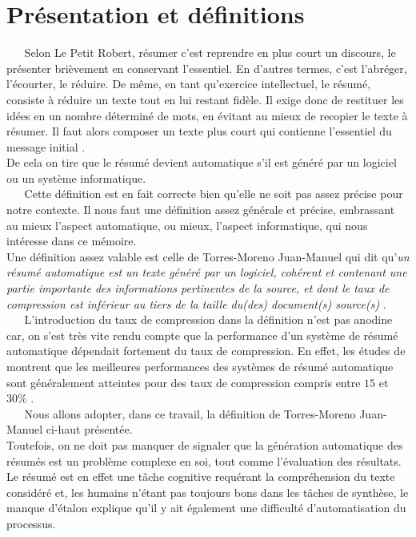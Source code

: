 \section{Présentation et définitions}
$ _{} $ $ _{} $ $ _{} $ $ _{} $ $ _{} $Selon Le Petit Robert, résumer c'est reprendre en plus court un discours, le présenter brièvement en conservant l'essentiel. En d'autres termes, c'est l'abréger, l'écourter, le réduire.
De même, en tant qu'exercice intellectuel, le résumé, consiste à réduire un texte tout en lui restant fidèle. Il exige donc de restituer les idées en un nombre déterminé de mots,  en évitant au mieux de recopier le texte à résumer. Il faut alors composer un texte plus court qui contienne l'essentiel du message initial \cite{fasoEduc}.\\
De cela on tire que le résumé devient automatique s'il est généré par un logiciel ou un système informatique.\\
$ _{} $ $ _{} $ $ _{} $ $ _{} $ $ _{} $Cette définition est en fait correcte bien qu'elle ne soit pas assez précise pour notre contexte. Il nous faut une définition assez générale et précise, embrassant au mieux l'aspect automatique, ou mieux, l'aspect informatique, qui nous intéresse dans ce mémoire.\\
Une définition assez valable est celle de Torres-Moreno Juan-Manuel qui dit qu'\textit{un résumé automatique est un texte généré par un logiciel, cohérent et contenant une partie im\-por\-tan\-te des informations pertinentes de la source, et dont le taux de compression est inférieur au tiers de la taille du(des) document(s) source(s)} \cite{torres2014automatic}.\\
$ _{} $ $ _{} $ $ _{} $ $ _{} $ $ _{} $L'introduction du taux de compression dans la définition n'est pas anodine car, on s'est très vite rendu compte que la performance d'un système de résumé automatique dépendait fortement du taux de compression. En effet, les études de \cite{Lin1999TrainingAS} montrent que les meilleures performances des systèmes de résumé automatique sont généralement atteintes pour des taux de compression compris entre $ 15 $ et $ 30\% $ \cite{torres2014automatic}.\\
$ _{} $ $ _{} $ $ _{} $ $ _{} $ $ _{} $Nous allons adopter, dans ce travail, la définition de Torres-Moreno Juan-Manuel ci-haut présentée.\\

Toutefois, on ne doit pas manquer de signaler que la génération automatique des résumés est un problème complexe en soi, tout comme l'évaluation des résultats. Le résumé est en effet une tâche cognitive requérant la compréhension du texte considéré et, les humains n'étant pas toujours bons dans les tâches de synthèse, le manque d'étalon explique qu'il y ait également une difficulté d'automatisation du processus.

